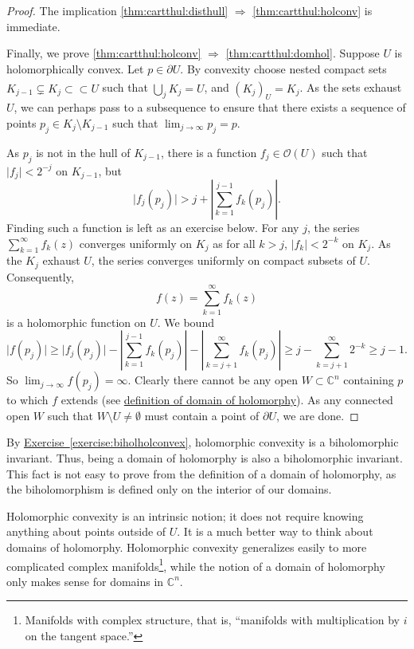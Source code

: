 \documentclass[12pt,openany]{book}
\newcommand{\sabs}[1]{\lvert {#1} \rvert}
\newcommand{\abs}[1]{\left\lvert {#1} \right\rvert}
\newcommand{\C}{{\mathbb{C}}}
\newcommand{\sO}{{\mathscr{O}}}
\theoremstyle{plain}
\theoremstyle{remark}
\theoremstyle{definition}
\theoremstyle{exercise}
\theoremstyle{example}
\newcommand{\exerciseref}[1]{\hyperref[#1]{Exercise~\ref*{#1}}}
\begin{document}
\begin{proof}
The implication \ref{thm:cartthul:disthull} $\Rightarrow$
\ref{thm:cartthul:holconv} is immediate.

Finally, we prove
\ref{thm:cartthul:holconv} $\Rightarrow$
\ref{thm:cartthul:domhol}.
Suppose $U$ is holomorphically convex.  Let $p \in \partial U$.
By convexity choose nested compact sets $K_{j-1} \subsetneq K_j \subset
\subset U$ such that $\bigcup_j K_j = U$, and $\widehat{(K_j)}_U = K_j$.
As the sets exhaust $U$, we can perhaps pass to a subsequence
to ensure that
there exists a 
sequence of points $p_j \in K_j \setminus K_{j-1}$ such that
$\lim_{j\to\infty} p_j = p$.

As $p_j$ is not in the hull of $K_{j-1}$, there is a function $f_j \in
\sO(U)$ such that $\sabs{f_j} < 2^{-j}$ on $K_{j-1}$, but
\begin{equation*}
\sabs{f_j(p_j)} > j + \abs{\sum_{k=1}^{j-1} f_k(p_j)} .
\end{equation*}
Finding such a function is left as an exercise below.
For any $j$, the series $\sum_{k=1}^\infty f_k(z)$ converges uniformly on $K_j$
as for all $k > j$, $\sabs{f_k} < 2^{-k}$ on $K_j$.
As the $K_j$ exhaust $U$, the series converges uniformly on compact
subsets of $U$.  Consequently,
\begin{equation*}
f(z) = \sum_{k=1}^\infty f_k(z)
\end{equation*}
is a holomorphic function on $U$.  We bound
\begin{equation*}
\sabs{f(p_j)} \geq
\sabs{f_j(p_j)}
-
\abs{\sum_{k=1}^{j-1} f_k(p_j)}
-
\abs{\sum_{k=j+1}^\infty f_k(p_j)}
\geq
j
-
\sum_{k=j+1}^\infty 2^{-k}
\geq j-1 .
\end{equation*}
So $\lim_{j\to\infty} f(p_j) = \infty$.
Clearly there cannot be any open $W \subset \C^n$
containing $p$ to which $f$ extends (see
\hyperref[defn:domainofhol]{definition of domain of holomorphy}).  As any
connected open $W$ such that $W \setminus U \not= \emptyset$ must contain a
point of $\partial U$, we are done.
\end{proof}

By \exerciseref{exercise:biholholconvex},
holomorphic convexity is a biholomorphic invariant.
Thus,
being a domain of holomorphy is also a biholomorphic invariant.  This
fact is not easy to prove from the definition of a domain of
holomorphy, as the
biholomorphism is defined only on the interior of our domains.

Holomorphic convexity is an intrinsic notion; it does not require
knowing anything about points outside of $U$.  It is a much
better way to think about domains of holomorphy.  Holomorphic
convexity generalizes easily to more complicated complex
manifolds\footnote{Manifolds with complex structure, that is, ``manifolds
with multiplication by $i$ on the tangent space.''}, while
the notion of a domain of holomorphy only makes sense for domains in $\C^n$.
\end{document}
